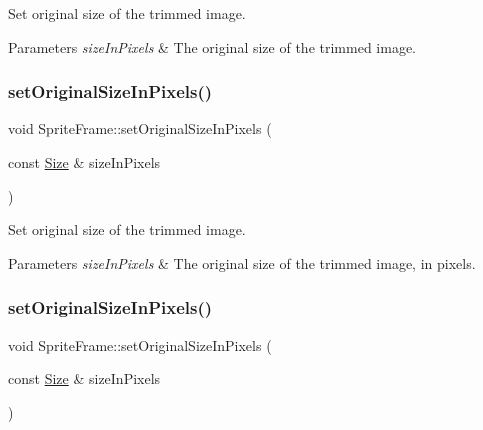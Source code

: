 Set original size of the trimmed image.


\begin{DoxyParams}{Parameters}
{\em size\+In\+Pixels} & The original size of the trimmed image. \\
\hline
\end{DoxyParams}
\mbox{\label{classSpriteFrame_ae9686ba8c8e9353f9bed4644e2c7d7e6}} 
\subsubsection{\texorpdfstring{set\+Original\+Size\+In\+Pixels()}{setOriginalSizeInPixels()}\hspace{0.1cm}{\footnotesize\ttfamily [1/2]}}
{\footnotesize\ttfamily void Sprite\+Frame\+::set\+Original\+Size\+In\+Pixels (\begin{DoxyParamCaption}\item[{const \hyperlink{classSize}{Size} \&}]{size\+In\+Pixels }\end{DoxyParamCaption})\hspace{0.3cm}{\ttfamily [inline]}}

Set original size of the trimmed image.


\begin{DoxyParams}{Parameters}
{\em size\+In\+Pixels} & The original size of the trimmed image, in pixels. \\
\hline
\end{DoxyParams}
\mbox{\label{classSpriteFrame_ae9686ba8c8e9353f9bed4644e2c7d7e6}} 
\subsubsection{\texorpdfstring{set\+Original\+Size\+In\+Pixels()}{setOriginalSizeInPixels()}\hspace{0.1cm}{\footnotesize\ttfamily [2/2]}}
{\footnotesize\ttfamily void Sprite\+Frame\+::set\+Original\+Size\+In\+Pixels (\begin{DoxyParamCaption}\item[{const \hyperlink{classSize}{Size} \&}]{size\+In\+Pixels }\end{DoxyParamCaption})\hspace{0.3cm}{\ttfamily [inline]}}

